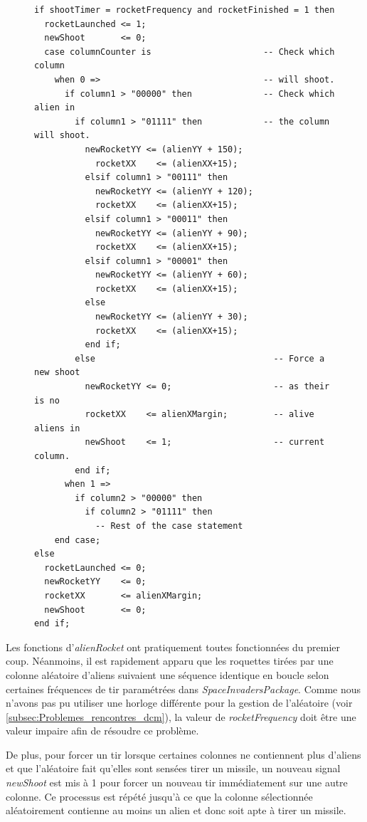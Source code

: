\documentclass[french]{nakrule}
\begin{document}
\begin{figure}
\begin{lstlisting}[style=vhdl, caption=Tir de rockets]
if shootTimer = rocketFrequency and rocketFinished = 1 then
  rocketLaunched <= 1;
  newShoot       <= 0;
  case columnCounter is                      -- Check which column
    when 0 =>                                -- will shoot.
      if column1 > "00000" then              -- Check which alien in
        if column1 > "01111" then            -- the column will shoot.
          newRocketYY <= (alienYY + 150);
            rocketXX    <= (alienXX+15);
          elsif column1 > "00111" then
            newRocketYY <= (alienYY + 120);
            rocketXX    <= (alienXX+15);
          elsif column1 > "00011" then
            newRocketYY <= (alienYY + 90);
            rocketXX    <= (alienXX+15);
          elsif column1 > "00001" then
            newRocketYY <= (alienYY + 60);
            rocketXX    <= (alienXX+15);
          else
            newRocketYY <= (alienYY + 30);
            rocketXX    <= (alienXX+15);
          end if;
        else                                   -- Force a new shoot
          newRocketYY <= 0;                    -- as their is no
          rocketXX    <= alienXMargin;         -- alive aliens in
          newShoot    <= 1;                    -- current column.
        end if;
      when 1 =>
        if column2 > "00000" then
          if column2 > "01111" then
            -- Rest of the case statement
    end case;
else
  rocketLaunched <= 0;
  newRocketYY    <= 0;
  rocketXX       <= alienXMargin;
  newShoot       <= 0;
end if;
\end{lstlisting}
\end{figure}
Les fonctions d'\emph{alienRocket} ont pratiquement toutes fonctionnées du
premier coup. Néanmoins, il est rapidement apparu que les roquettes tirées par
une colonne aléatoire d'aliens suivaient une séquence identique en boucle selon
certaines fréquences de tir paramétrées dans \emph{SpaceInvadersPackage}. Comme
nous n'avons pas pu utiliser une horloge différente pour la gestion de
l'aléatoire (voir \ref{subsec:Problemes_rencontres_dcm}), la valeur de
\emph{rocketFrequency} doit être une valeur impaire afin de résoudre ce
problème.

De plus, pour forcer un tir lorsque certaines colonnes ne contiennent plus d'aliens
et que l'aléatoire fait qu'elles sont sensées tirer un missile, un nouveau
signal \emph{newShoot} est mis à 1 pour forcer un nouveau tir immédiatement sur
une autre colonne. Ce processus est répété jusqu'à ce que la colonne
sélectionnée aléatoirement contienne au moins un alien et donc soit apte à tirer
un missile.
\end{document}
